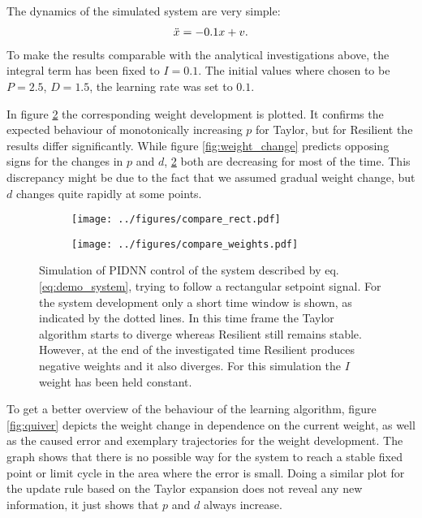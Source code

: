 \documentclass{article}
\begin{document}
    The dynamics of the simulated system are very simple: 
    \begin{align}
        \ddot{x} = -0.1 x + v. \label{eq:demo_system}
    \end{align}
    To make the results comparable with the analytical investigations above, the integral term has been fixed to $I=0.1$.
    The initial values where chosen to be $P=2.5$, $D=1.5$, the learning rate was set to $0.1$.

    In figure \ref{subfig:sim:weights} the corresponding weight development is plotted. It confirms the expected behaviour 
    of monotonically increasing $p$ for Taylor, but for Resilient the results differ significantly. While figure 
    \ref{fig:weight_change} predicts opposing signs for the changes in $p$ and $d$, \ref{subfig:sim:weights} both are 
    decreasing for most of the time. This discrepancy might be due to the fact that we assumed gradual weight change, 
    but $d$ changes quite rapidly at some points.
    \begin{figure}[htb]
    \begin{subfigure}[c]{0.5\textwidth}
        \texttt{[image: ../figures/compare\_rect.pdf]}
        \label{subfig:sim:control}
    \end{subfigure}
    \begin{subfigure}[c]{0.5\textwidth}
        \texttt{[image: ../figures/compare\_weights.pdf]}
        \label{subfig:sim:weights}
    \end{subfigure}
    \caption{Simulation of PIDNN control of the system described by eq. \eqref{eq:demo_system}, trying to follow
             a rectangular setpoint signal. For the
             system development only a short time window is shown, as indicated by the dotted lines.
             In this time frame the Taylor algorithm starts to diverge whereas Resilient still
             remains stable. However, at the end of the investigated time Resilient produces
             negative weights and it also diverges. For this simulation the $I$ weight has been held constant.}
    \label{fig:weights}
    \end{figure}

    To get a better overview of the behaviour of the learning algorithm, figure \ref{fig:quiver} depicts the weight 
    change in dependence on the current weight, as well as the caused error and exemplary trajectories for the weight
    development. The graph shows that there is no possible way for the system to reach a stable fixed point or limit 
    cycle in the area where the error is small. Doing a similar plot for the update rule based on the Taylor expansion
    does not reveal any new information, it just shows that $p$ and $d$ always increase.
\end{document}
